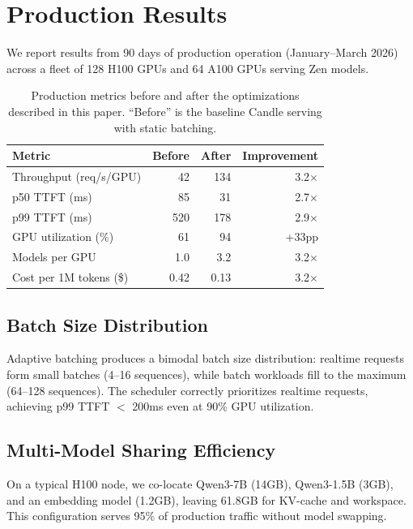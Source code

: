 \documentclass[11pt]{article}
\begin{document}
\section{Production Results}
\label{sec:results}

We report results from 90 days of production operation (January--March 2026)
across a fleet of 128 H100 GPUs and 64 A100 GPUs serving Zen models.

\begin{table}[H]
\centering
\small
\begin{tabular}{lrrr}
\toprule
\textbf{Metric} & \textbf{Before} & \textbf{After} & \textbf{Improvement} \\
\midrule
Throughput (req/s/GPU) & 42 & 134 & 3.2$\times$ \\
p50 TTFT (ms) & 85 & 31 & 2.7$\times$ \\
p99 TTFT (ms) & 520 & 178 & 2.9$\times$ \\
GPU utilization (\%) & 61 & 94 & +33pp \\
Models per GPU & 1.0 & 3.2 & 3.2$\times$ \\
Cost per 1M tokens (\$) & 0.42 & 0.13 & 3.2$\times$ \\
\bottomrule
\end{tabular}
\caption{Production metrics before and after the optimizations described in this
paper. ``Before'' is the baseline Candle serving with static batching.}
\label{tab:results}
\end{table}

\subsection{Batch Size Distribution}

Adaptive batching produces a bimodal batch size distribution: realtime requests
form small batches (4--16 sequences), while batch workloads fill to the maximum
(64--128 sequences). The scheduler correctly prioritizes realtime requests,
achieving p99 TTFT $<$ 200ms even at 90\% GPU utilization.

\subsection{Multi-Model Sharing Efficiency}

On a typical H100 node, we co-locate Qwen3-7B (14GB), Qwen3-1.5B (3GB), and
an embedding model (1.2GB), leaving 61.8GB for KV-cache and workspace. This
configuration serves 95\% of production traffic without model swapping.
\end{document}
